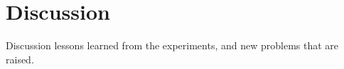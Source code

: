 \chapter{Discussion}
Discussion lessons learned from the experiments, and new problems that are raised. 